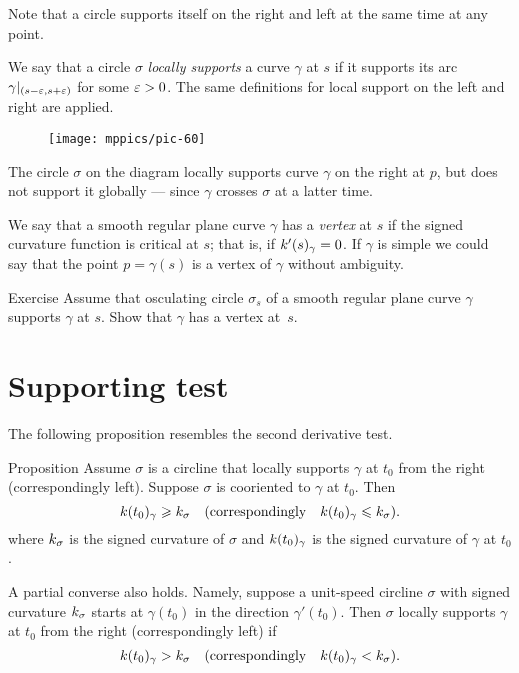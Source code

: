 Note that a circle supports itself on the right and left at the same time at any point.

We say that a circle $\sigma$ \emph{locally supports} a curve $\gamma$ at $s$
if it supports its arc $\gamma|_{(s-\varepsilon,s+\varepsilon)}$ for some $\varepsilon>0$.
The same definitions for local support on the left and right are applied.

\begin{wrapfigure}{o}{43 mm}
\vskip-3mm
\centering
\texttt{[image: mppics/pic-60]}
\vskip0mm
\end{wrapfigure}


The circle $\sigma$ on the diagram locally supports curve $\gamma$ on the right at $p$, but does not support it globally --- since $\gamma$ crosses $\sigma$ at a latter time.


We say that a smooth regular plane curve $\gamma$ has a \emph{vertex} at $s$
if the signed curvature function is critical at $s$;
that is, if $k'(s)_\gamma=0$.
If $\gamma$ is simple we could say that the point $p=\gamma(s)$ is a vertex of $\gamma$ without ambiguity.

\begin{thm}{Exercise}\label{ex:vertex-support}
Assume that osculating circle $\sigma_s$ of a smooth regular plane curve $\gamma$ supports $\gamma$ at $s$.
Show that $\gamma$ has a vertex at~$s$.
\end{thm}


\section*{Supporting test}

The following proposition resembles the second derivative test. 

\begin{thm}{Proposition}\label{prop:supporting-circline}
Assume $\sigma$ is a circline that locally supports $\gamma$ at $t_0$ from the right (correspondingly left). 
Suppose $\sigma$ is cooriented to $\gamma$ at $t_0$.
Then 
\[k(t_0)_\gamma\geqslant k_\sigma
\quad(\text{correspondingly}\quad k(t_0)_\gamma\leqslant k_\sigma).
\] 
where $k_\sigma$ is the signed curvature of $\sigma$ 
and $k(t_0)_\gamma$ is the signed curvature of $\gamma$ at $t_0$.

A partial converse also holds.
Namely, suppose a unit-speed circline $\sigma$ with signed curvature $k_\sigma$ starts at $\gamma(t_0)$ in the direction $\gamma'(t_0)$.
Then $\sigma$ locally supports $\gamma$ at $t_0$ from the right (correspondingly left) if 
\[k(t_0)_\gamma> k_\sigma
\quad(\text{correspondingly}\quad k(t_0)_\gamma< k_\sigma).
\]

\end{thm}

